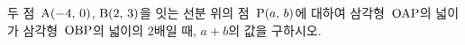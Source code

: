 두 점~$\mathrm{A}(-4,\mkern3mu 0)$, $\mathrm{B}(2,\mkern3mu 3)$을 잇는 선분 위의 점~$\mathrm{P}(a,\mkern3mu b)$에 대하여 삼각형~$\mathrm{OAP}$의 넓이가 삼각형~$\mathrm{OBP}$의 넓이의 $2$배일 때, $a+b$의 값을 구하시오. 
